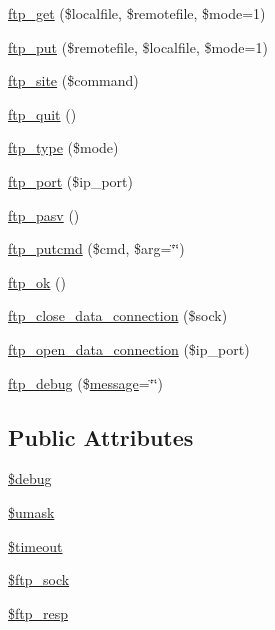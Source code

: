 \begin{DoxyCompactItemize}
\item 
\hyperlink{classftp_a1d7ba9f87f7c5d628876ffe7baf36705}{ftp\+\_\+get} (\$localfile, \$remotefile, \$mode=1)
\item 
\hyperlink{classftp_a509ed4c9d69177fe1b0ad2a02fbc8c27}{ftp\+\_\+put} (\$remotefile, \$localfile, \$mode=1)
\item 
\hyperlink{classftp_ad8d0e176790559ee27d1008dede58b6a}{ftp\+\_\+site} (\$command)
\item 
\hyperlink{classftp_a993db0725e312a4c202d6b1c84780df3}{ftp\+\_\+quit} ()
\item 
\hyperlink{classftp_ab8a20478b19800963c3a92762e78faa8}{ftp\+\_\+type} (\$mode)
\item 
\hyperlink{classftp_a94ba304efdf7e1a4a0053d94706a36c9}{ftp\+\_\+port} (\$ip\+\_\+port)
\item 
\hyperlink{classftp_a9141940878edcf85afee18e8dcdc6064}{ftp\+\_\+pasv} ()
\item 
\hyperlink{classftp_a77dcfe6900e85bbd3c22308123905eee}{ftp\+\_\+putcmd} (\$cmd, \$arg=\char`\"{}\char`\"{})
\item 
\hyperlink{classftp_a91d52ff0c56f9374cbaeae48cb54f604}{ftp\+\_\+ok} ()
\item 
\hyperlink{classftp_ae476d651d3ec9ea3b00f19371d9fcece}{ftp\+\_\+close\+\_\+data\+\_\+connection} (\$sock)
\item 
\hyperlink{classftp_a493907034238b378487fba4c25af0509}{ftp\+\_\+open\+\_\+data\+\_\+connection} (\$ip\+\_\+port)
\item 
\hyperlink{classftp_adb6a01340ad0c2f579fae61b8777aaad}{ftp\+\_\+debug} (\$\hyperlink{classmessage}{message}=\char`\"{}\char`\"{})
\end{DoxyCompactItemize}
\subsection*{Public Attributes}
\begin{DoxyCompactItemize}
\item 
\hyperlink{classftp_a757e4db04d53816db79f117809ffbad2}{\$debug}
\item 
\hyperlink{classftp_a40322387fc5aa5074daf7aaa4b7aa742}{\$umask}
\item 
\hyperlink{classftp_a219848d21bf555048933e205c270b530}{\$timeout}
\item 
\hyperlink{classftp_a3beffe299e11edfce6ffe4608c2f5dc8}{\$ftp\+\_\+sock}
\item 
\hyperlink{classftp_a2bc470fe4d815181c723061b1d2ad824}{\$ftp\+\_\+resp}
\end{DoxyCompactItemize}


